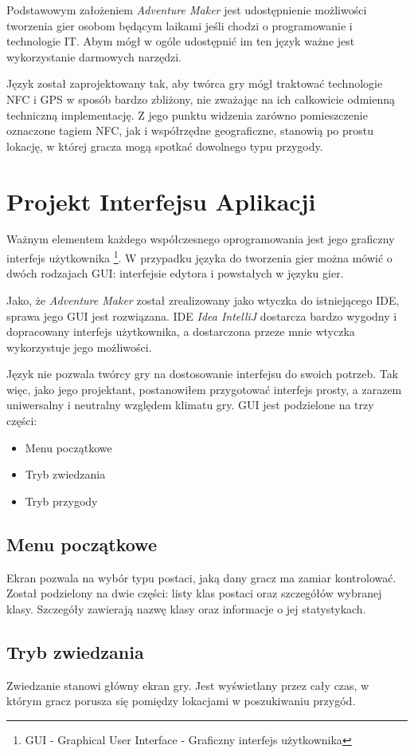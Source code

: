 \documentclass[openright]{xmgr}
\begin{document}
Podstawowym założeniem \textit{Adventure Maker} jest udostępnienie możliwości tworzenia gier osobom będącym laikami jeśli chodzi o programowanie i technologie IT. Abym mógł w ogóle udostępnić im ten język ważne jest wykorzystanie darmowych narzędzi.

Język został zaprojektowany tak, aby twórca gry mógł traktować technologie NFC i GPS w sposób bardzo zbliżony, nie zważając na ich  całkowicie odmienną techniczną implementację. Z jego punktu widzenia zarówno pomieszczenie oznaczone tagiem NFC, jak i współrzędne geograficzne, stanowią po prostu lokację, w której gracza mogą spotkać dowolnego typu przygody. 

\chapter{Projekt Interfejsu Aplikacji}
Ważnym elementem każdego współczesnego oprogramowania jest jego graficzny interfejs użytkownika \footnote{GUI - Graphical User Interface - Graficzny interfejs użytkownika}. W przypadku języka do tworzenia gier można mówić o dwóch rodzajach GUI: interfejsie edytora i powstałych w języku gier. 

Jako, że \textit{Adventure Maker} został zrealizowany jako wtyczka do istniejącego IDE, sprawa jego GUI jest rozwiązana. IDE \textit{Idea IntelliJ} dostarcza bardzo wygodny i dopracowany interfejs użytkownika, a dostarczona przeze mnie wtyczka wykorzystuje jego możliwości. 

Język nie pozwala twórcy gry na dostosowanie interfejsu do swoich potrzeb. Tak więc, jako jego projektant, postanowiłem przygotować interfejs prosty, a zarazem uniwersalny i neutralny względem klimatu gry. GUI jest podzielone na trzy części:
\begin{itemize}
	\item Menu początkowe
	\item Tryb zwiedzania
	\item Tryb przygody
\end{itemize}
\section{Menu początkowe}
Ekran pozwala na wybór typu postaci, jaką dany gracz ma zamiar kontrolować. Został podzielony na dwie części: listy klas postaci oraz szczegółów wybranej klasy. Szczegóły zawierają nazwę klasy oraz informacje o jej statystykach.

\section{Tryb zwiedzania}
Zwiedzanie stanowi główny ekran gry. Jest wyświetlany przez cały czas, w którym gracz porusza się pomiędzy lokacjami w poszukiwaniu przygód. 
\end{document}
